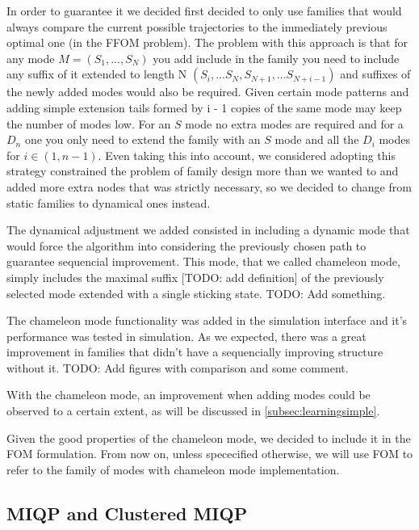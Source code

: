 \documentclass[12,twoside]{TFG-GM}
\theoremstyle{definition}
\theoremstyle{remark}
\begin{document}
In order to guarantee it we decided first decided to only use families that would always compare the current possible trajectories to the immediately previous optimal one (in the FFOM problem). The problem with this approach is that for any mode $M = (S_1, ..., S_N)$ you add include in the family you need to include any suffix of it extended to length N $(S_i, ... S_N, S_{N+1}, ... S_{N+i-1})$ and suffixes of the newly added modes would also be required. Given certain mode patterns and adding simple extension tails formed by i - 1 copies of the same mode may keep the number of modes low. For an $S$ mode no extra modes are required and for a $D_n$ one you only need to extend the family with an $S$ mode and all the $D_i$ modes for $i \in (1, n-1)$. Even taking this into account, we considered adopting this strategy constrained the problem of family design more than we wanted to and added more extra nodes that was strictly necessary, so we decided to change from static families to dynamical ones instead.

The dynamical adjustment we added consisted in including a dynamic mode that would force the algorithm into considering the previously chosen path to guarantee sequencial improvement. This mode, that we called chameleon mode, simply includes the maximal suffix [TODO: add definition] of the previously selected mode extended with a single sticking state. TODO: Add something.

The chameleon mode functionality was added in the simulation interface and it's performance was tested in simulation. As we expected, there was a great improvement in families that didn't have a sequencially improving structure without it. TODO: Add figures with comparison and some comment.

With the chameleon mode, an improvement when adding modes could be observed to a certain extent, as will be discussed in \ref{subsec:learningsimple}.

Given the good properties of the chameleon mode, we decided to include it in the FOM formulation. From now on, unless spececified otherwise, we will use FOM to refer to the family of modes with chameleon mode implementation.

\subsection{MIQP and Clustered MIQP}
\label{subsec:miqp}
\end{document}
